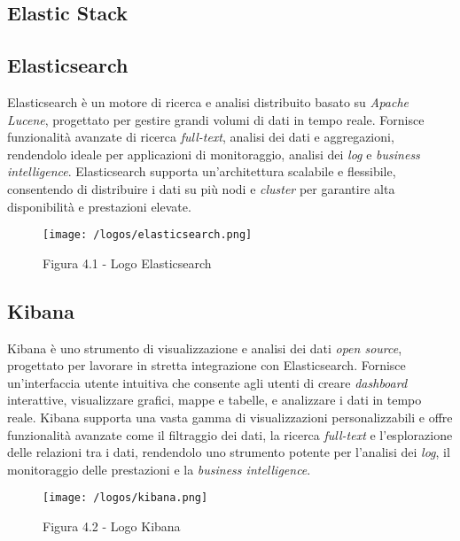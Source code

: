 \subsection{Elastic Stack}

\subsection*{Elasticsearch}
Elasticsearch è un motore di ricerca e analisi distribuito basato su \emph{Apache Lucene}, progettato per gestire grandi volumi di dati in tempo reale. Fornisce funzionalità avanzate di ricerca \emph{full-text}, analisi dei dati e aggregazioni, rendendolo ideale per applicazioni di monitoraggio, analisi dei \emph{log} e \emph{business intelligence}. Elasticsearch supporta un'architettura scalabile e flessibile, consentendo di distribuire i dati su più nodi e \emph{cluster} per garantire alta disponibilità e prestazioni elevate.
\begin{figure}[H] 
    \centering 
    \texttt{[image: /logos/elasticsearch.png]} 
    \caption{Figura 4.1 - Logo Elasticsearch}
\end{figure}

\vspace{1em}

\subsection*{Kibana}
Kibana è uno strumento di visualizzazione e analisi dei dati \emph{open source}, progettato per lavorare in stretta integrazione con Elasticsearch. Fornisce un'interfaccia utente intuitiva che consente agli utenti di creare \emph{dashboard} interattive, visualizzare grafici, mappe e tabelle, e analizzare i dati in tempo reale. Kibana supporta una vasta gamma di visualizzazioni personalizzabili e offre funzionalità avanzate come il filtraggio dei dati, la ricerca \emph{full-text} e l'esplorazione delle relazioni tra i dati, rendendolo uno strumento potente per l'analisi dei \emph{log}, il monitoraggio delle prestazioni e la \emph{business intelligence}.
\begin{figure}[H] 
    \centering 
    \texttt{[image: /logos/kibana.png]} 
    \caption{Figura 4.2 - Logo Kibana}
\end{figure}

\vspace{1em}

